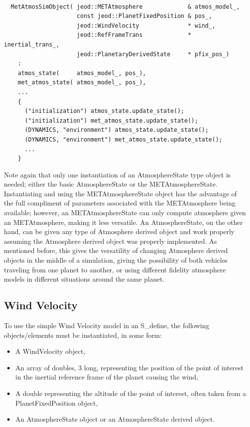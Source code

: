 \begin{verbatim}

  MetAtmosSimObject( jeod::METAtmosphere             & atmos_model_,
                     const jeod::PlanetFixedPosition & pos_,
                     jeod::WindVelocity              * wind_,
                     jeod::RefFrameTrans             * inertial_trans_,
                     jeod::PlanetaryDerivedState     * pfix_pos_)
    :
    atmos_state(     atmos_model_, pos_),
    met_atmos_state( atmos_model_, pos_),
    ...
    {
      ("initialization") atmos_state.update_state();
      ("initialization") met_atmos_state.update_state();
      (DYNAMICS, "environment") atmos_state.update_state();
      (DYNAMICS, "environment") met_atmos_state.update_state();
      ...
    }

\end{verbatim}

Note again that only one instantiation of an AtmosphereState type object is needed;
either the basic AtmosphereState or the METAtmosphereState. Instantiating and
using the METAtmosphereState object has the advantage of the full compliment of
parameters associated with the METAtmosphere being available; however, an
METAtmosphereState can only compute atmosphere given an METAtmosphere, making it
less versatile. An AtmosphereState, on the other hand, can be given any type of
Atmosphere derived object and work properly assuming the Atmosphere derived object was properly
implemented. As mentioned before, this gives the versatility
of changing Atmosphere derived objects in the middle of a simulation, giving
the possibility of both vehicles traveling from one planet to another, or
using different fidelity atmosphere models in different situations around the
same planet.

\subsection{Wind Velocity}

To use the simple Wind Velocity model in an S\_define, the following
objects/elements must be instantiated, in some form:

\begin{itemize}
\item A WindVelocity object,
\item An array of doubles, 3 long, representing the position of the point of
interest in the inertial reference frame of the planet causing the wind,
\item A double representing the altitude of the point of interest, often
taken from a PlanetFixedPosition object,
\item An AtmosphereState object or an AtmosphereState derived object.
\end{itemize}

